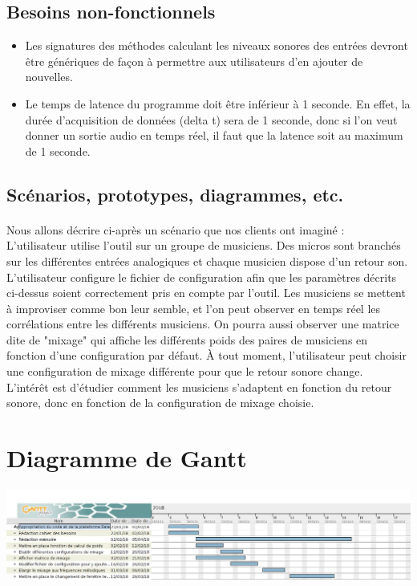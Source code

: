 \documentclass{article}
\begin{document}
    \subsection{Besoins non-fonctionnels}
    \begin{itemize}
      \item Les signatures des méthodes calculant les niveaux sonores des
      entrées devront être génériques de façon à permettre aux utilisateurs d'en
      ajouter de nouvelles.
      \item Le temps de latence du programme doit être inférieur à 1 seconde.
      En effet, la durée d'acquisition de données (delta t) sera de 1 seconde,
      donc si l'on veut donner un sortie audio en temps réel, il faut que la latence
      soit au maximum de 1 seconde.
    \end{itemize}
    \subsection{Scénarios, prototypes, diagrammes, etc.}
      \paragraph{}
      Nous allons décrire ci-après un scénario que nos clients ont imaginé :\\
      L'utilisateur utilise l'outil sur un groupe de musiciens. Des micros sont
      branchés sur les différentes entrées analogiques et chaque musicien dispose
      d'un retour son. L'utilisateur configure le fichier de configuration afin
      que les paramètres décrits ci-dessus soient correctement pris en compte
      par l'outil. Les musiciens se mettent à improviser comme bon leur semble,
      et l'on peut observer en temps réel les corrélations entre les différents
      musiciens. On pourra aussi observer une matrice dite de "mixage" qui
      affiche les différents poids des paires de musiciens en fonction d'une
      configuration par défaut. À tout moment, l'utilisateur peut choisir une
      configuration de mixage différente pour que le retour sonore change.\\
      L'intérêt est d'étudier comment les musiciens s'adaptent en fonction du
      retour sonore, donc en fonction de la configuration de mixage choisie.
  \section{Diagramme de Gantt}
    \includegraphics[scale=0.35]{DiagrammeAnalyseBesoins.jpg}
  
\end{document}
